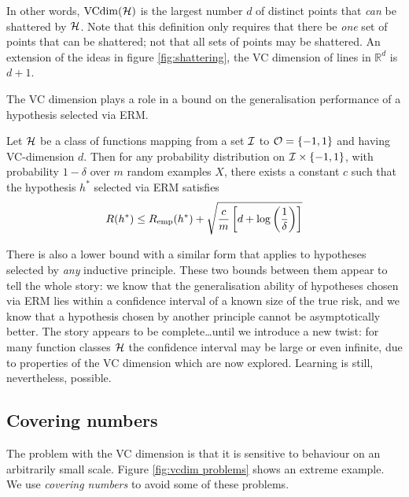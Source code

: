 In other words, $\mathrm{VCdim}(\mathcal{H})$ is the largest number $d$ of distinct
points that \emph{can} be shattered by $\mathcal{H}$.  Note that this
definition only requires that there be \emph{one} set of points that
can be shattered; not that all sets of points may be shattered.  An
extension of the ideas in figure \ref{fig:shattering}, the VC
dimension of lines in $\mathbb{R}^d$ is $d+1$.

The VC dimension plays a role in a bound on the generalisation
performance of a hypothesis selected via ERM. 

\begin{theorem}
Let $\mathcal{H}$ be a class of functions mapping from a set $\mathcal{I}$ to $\mathcal{O} =
\{-1, 1\}$ and having VC-dimension $d$.  Then for any probability
distribution on $\mathcal{I} \times \{-1,1\}$, with probability $1-\delta$
over $m$ random examples $X$, there exists a constant $c$ such that
the hypothesis $h^{\ast}$ selected via ERM satisfies
\begin{equation}
R(h^{\ast}) \leq R_{\mathrm{emp}}(h^{\ast}) + \sqrt{ \frac{c}{m} \left[ d
+ \log \left ( \frac{1}{\delta} \right) \right] }
\end{equation}
\end{theorem}

There is also a lower bound with a similar form that applies to
hypotheses selected by \emph{any} inductive principle.  These two
bounds between them appear to tell the whole story: we know that the
generalisation ability of hypotheses chosen via ERM lies within a
confidence interval of a known size of the true risk, and we know that
a hypothesis chosen by another principle cannot be asymptotically
better.  The story appears to be complete\ldots until we introduce a
new twist: for many function classes $\mathcal{H}$ the confidence interval
may be large or even infinite, due to properties of the VC dimension
which are now explored.  Learning is still, nevertheless, possible.

\subsection{Covering numbers}
\label{sec:covering numbers}

The problem with the VC dimension is that it is sensitive to behaviour
on an arbitrarily small scale.  Figure \ref{fig:vcdim problems} shows
an extreme example.  We use \emph{covering numbers} to avoid some of
these problems.

